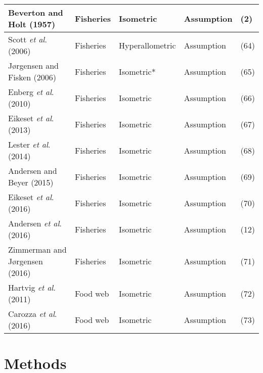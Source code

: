 \documentclass[a4paper]{article} %
\begin{document}
\begin{table}[]
\begin{tabular}{|l|l|l|l|l|}
        Beverton and Holt (1957)                & Fisheries           & Isometric        & Assumption                        & (2)           \\ \hline
        Scott \textit{et al}. (2006)            & Fisheries           & Hyperallometric  & Assumption                        & (64)          \\ \hline
        Jørgensen and Fisken (2006)             & Fisheries           & Isometric*       & Assumption                        & (65)          \\ \hline
        Enberg \textit{et al}. (2010)           & Fisheries           & Isometric        & Assumption                        & (66)          \\ \hline
        Eikeset \textit{et al}. (2013)          & Fisheries           & Isometric        & Assumption                        & (67)          \\ \hline
        Lester \textit{et al}. (2014)           & Fisheries           & Isometric        & Assumption                        & (68)          \\ \hline
        Andersen and Beyer (2015)               & Fisheries           & Isometric        & Assumption                        & (69)          \\ \hline
        Eikeset \textit{et al}. (2016)          & Fisheries           & Isometric        & Assumption                        & (70)          \\ \hline
        Andersen \textit{et al}. (2016)         & Fisheries           & Isometric        & Assumption                        & (12)          \\ \hline
        Zimmerman and Jørgensen (2016)          & Fisheries           & Isometric        & Assumption                        & (71)          \\ \hline
        Hartvig \textit{et al}. (2011)          & Food web            & Isometric        & Assumption                        & (72)          \\ \hline
        Carozza \textit{et al}. (2016)          & Food web            & Isometric        & Assumption                        & (73)          \\ \hline
        \end{tabular}
    \end{table}
\section{Methods}\thispagestyle{empty}
\lipsum
\end{document}

